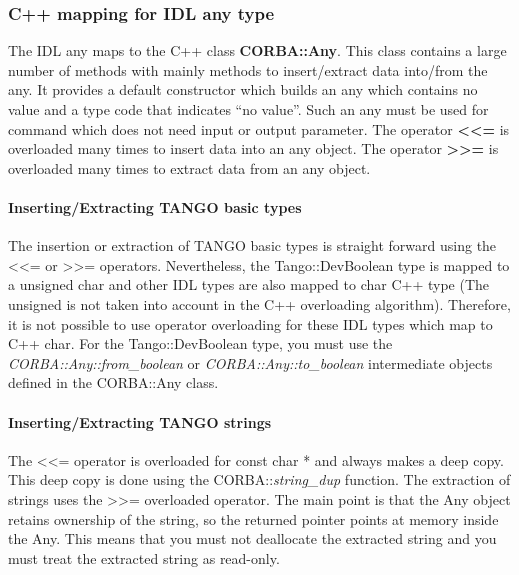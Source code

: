 \subsubsection{C++ mapping for IDL any type}

The IDL any maps to the C++ class \textbf{CORBA::Any}.
This class contains a large number of methods with mainly methods
to insert/extract data into/from the any. It provides a default constructor
which builds an any which contains no value and a type code that indicates
``no value''. Such an any must be used for command which does not
need input or output parameter. The operator \textbf{<\textcompwordmark{}<=}
is overloaded many times to insert data into an any object. The operator
\textbf{>\textcompwordmark{}>=} is overloaded many times to extract
data from an any object.


\paragraph{Inserting/Extracting TANGO basic types}

The insertion or extraction of TANGO basic types is straight forward
using the <\textcompwordmark{}<= or >\textcompwordmark{}>= operators.
Nevertheless, the Tango::DevBoolean type is mapped to a unsigned char
and other IDL types are also mapped to char C++ type (The unsigned
is not taken into account in the C++ overloading algorithm). Therefore,
it is not possible to use operator overloading for these IDL types
which map to C++ char. For the Tango::DevBoolean type, you must use
the \emph{CORBA::Any::from\_boolean} or \emph{CORBA::Any::to\_boolean}
intermediate objects defined in the CORBA::Any class.


\paragraph{Inserting/Extracting TANGO strings}

The <\textcompwordmark{}<= operator is overloaded for const char {*}
and always makes a deep copy. This deep copy is done using the CORBA::\emph{string\_dup}
function. The extraction of strings uses the >\textcompwordmark{}>=
overloaded operator. The main point is that the Any object
retains ownership of the string, so the returned pointer points at
memory inside the Any. This means that you must not
deallocate the extracted string and you must treat the extracted string
as read-only.


